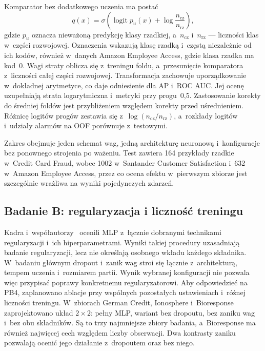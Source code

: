Komparator bez dodatkowego uczenia ma postać
\begin{equation}
q(x)=\sigma\!\left(\operatorname{logit}p_u(x)+\log\frac{n_{\mathrm{cz}}}{n_{\mathrm{rz}}}\right),
\label{eq:komparator-wazenia}
\end{equation}
gdzie $p_u$ oznacza nieważoną predykcję klasy rzadkiej, a~$n_{\mathrm{cz}}$ i~$n_{\mathrm{rz}}$ --- liczności klas w~części rozwojowej. Oznaczenia wskazują klasę rzadką i~częstą niezależnie od ich kodów, również w~danych Amazon Employee Access, gdzie klasa rzadka ma kod~0. Wagi straty oblicza się z~treningu foldu, a~przesunięcie komparatora z~liczności całej części rozwojowej. Transformacja zachowuje uporządkowanie w~dokładnej arytmetyce, co daje odniesienie dla AP i~ROC AUC. Jej ocenę uzupełniają strata logarytmiczna i~metryki przy progu~0,5. Zastosowanie korekty do średniej foldów jest przybliżeniem względem korekty przed uśrednieniem. Różnicę logitów progów zestawia się z~$\log(n_{\mathrm{cz}}/n_{\mathrm{rz}})$, a~rozkłady logitów i~udziały alarmów na OOF porównuje z~testowymi.

Zakres obejmuje jeden schemat wag, jedną architekturę neuronową i~konfiguracje bez ponownego strojenia po ważeniu. Test zawiera 164 przykłady rzadkie w~Credit Card Fraud, wobec 1002 w~Santander Customer Satisfaction i~632 w~Amazon Employee Access, przez co ocena efektu w~pierwszym zbiorze jest szczególnie wrażliwa na wyniki pojedynczych zdarzeń.

\subsection{Badanie B: regularyzacja i liczność treningu}
\label{sec:projekt-regularyzacja}

Kadra i~współautorzy~\cite{kadra2021regularization} ocenili MLP z~łącznie dobranymi technikami regularyzacji i~ich hiperparametrami. Wyniki takiej procedury uzasadniają badanie regularyzacji, lecz nie określają osobnego wkładu każdego składnika. W~badaniu głównym dropout i~zanik wag stroi się łącznie z~architekturą, tempem uczenia i~rozmiarem partii. Wynik wybranej konfiguracji nie pozwala więc przypisać poprawy konkretnemu regularyzatorowi. Aby odpowiedzieć na PB4, zaplanowano ablacje przy wspólnych pozostałych ustawieniach i~różnej liczności treningu. W~zbiorach German Credit, Ionosphere i~Bioresponse zaprojektowano układ $2\times2$: pełny MLP, wariant bez dropoutu, bez zaniku wag i~bez obu składników. Są to trzy najmniejsze zbiory badania, a~Bioresponse ma również najwięcej cech względem liczby obserwacji. Dwa kontrasty zaniku pozwalają ocenić jego działanie z~dropoutem oraz bez niego.

